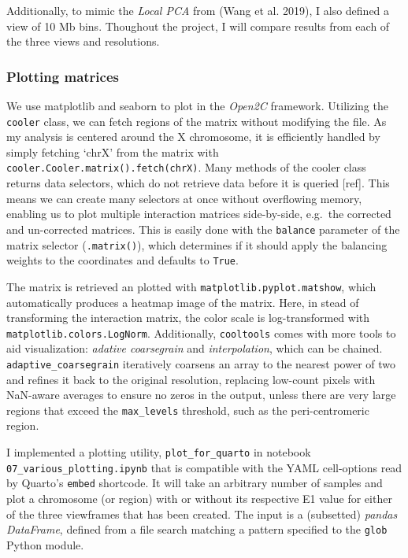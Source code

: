 \documentclass[
  11pt,
  a4paper,
]{scrbook}
\let\oldemph\emph
\renewcommand\emph[1]{\oldemph{\color{gray}#1}}
\begin{document}
Additionally, to mimic the \emph{Local PCA} from (Wang et al. 2019), I
also defined a view of 10 Mb bins. Thoughout the project, I will compare
results from each of the three views and resolutions.

\subsubsection{Plotting matrices}\label{plotting-matrices}

We use matplotlib and seaborn to plot in the \emph{Open2C} framework.
Utilizing the \texttt{cooler} class, we can fetch regions of the matrix
without modifying the file. As my analysis is centered around the X
chromosome, it is efficiently handled by simply fetching `chrX' from the
matrix with
\texttt{cooler.Cooler.matrix().fetch(\textquotesingle{}chrX\textquotesingle{})}.
Many methods of the cooler class returns data selectors, which do not
retrieve data before it is queried {[}ref{]}. This means we can create
many selectors at once without overflowing memory, enabling us to plot
multiple interaction matrices side-by-side, e.g.~the corrected and
un-corrected matrices. This is easily done with the \texttt{balance}
parameter of the matrix selector (\texttt{.matrix()}), which determines
if it should apply the balancing weights to the coordinates and defaults
to \texttt{True}.

The matrix is retrieved an plotted with
\texttt{matplotlib.pyplot.matshow}, which automatically produces a
heatmap image of the matrix. Here, in stead of transforming the
interaction matrix, the color scale is log-transformed with
\texttt{matplotlib.colors.LogNorm}. Additionally, \texttt{cooltools}
comes with more tools to aid visualization: \emph{adative coarsegrain}
and \emph{interpolation}, which can be chained.
\texttt{adaptive\_coarsegrain} iteratively coarsens an array to the
nearest power of two and refines it back to the original resolution,
replacing low-count pixels with NaN-aware averages to ensure no zeros in
the output, unless there are very large regions that exceed the
\texttt{max\_levels} threshold, such as the peri-centromeric region.

I implemented a plotting utility, \texttt{plot\_for\_quarto} in notebook
\texttt{07\_various\_plotting.ipynb} that is compatible with the YAML
cell-options read by Quarto's \texttt{embed} shortcode. It will take an
arbitrary number of samples and plot a chromosome (or region) with or
without its respective E1 value for either of the three viewframes that
has been created. The input is a (subsetted) \emph{pandas DataFrame},
defined from a file search matching a pattern specified to the
\texttt{glob} Python module.
\end{document}
